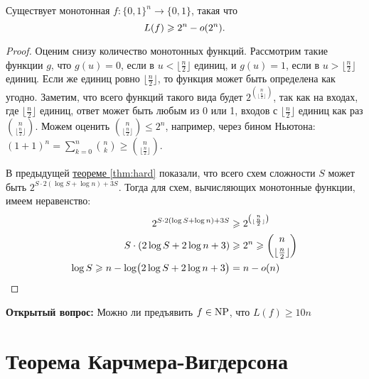 \begin{thm}
	Существует монотонная $ f \colon \{0, 1\}^{n} \to  \{0, 1\}$, такая что 
	$$ L(f) \geqslant 2^{n} - o(2^{n}) .$$
\end{thm}
\begin{proof}
Оценим снизу количество монотонных функций. Рассмотрим такие функции $g$, что $g(u) = 0$, если в $u < \lfloor \frac{n}{2} \rfloor$ единиц, и $g(u) = 1$, если в $u > \lfloor \frac{n}{2} \rfloor$ единиц. Если же единиц ровно $\lfloor \frac{n}{2} \rfloor$, то функция может быть определена как угодно. 
Заметим, что всего функций такого вида будет $2^{n \choose \lfloor \frac{n}{2} \rfloor}$, так как на входах, где  $\lfloor \frac{n}{2} \rfloor$ единиц, ответ может быть любым из 0 или 1, входов с $\lfloor \frac{n}{2} \rfloor$  единиц как раз ${n \choose \lfloor \frac{n}{2} \rfloor}$. 
Можем оценить ${n \choose {\lfloor \frac{n}{2} \rfloor}} \le 2^n$, например, через бином Ньютона: $(1+1)^n = \sum_{k=0}^n {n \choose k} \ge {n \choose \lfloor \frac{n}{2} \rfloor}$.

В предыдущей \hyperref[thm:hard]{теореме \ref{thm:hard}} показали, что всего схем сложности $S$ может быть $2^{S \cdot  2( \log S + \log n) + 3S} $. Тогда для схем, вычисляющих монотонные функции, имеем неравенство:
\begin{align*}
		2^{S \cdot  2( \log S + \log n) + 3S} &\geqslant  2^ {{n \choose \lfloor \frac{n}{2} \rfloor}} \\
		S \cdot  ( 2\log S + 2\log n + 3)&\geqslant 2^n \geqslant {{n \choose \lfloor \frac{n}{2} \rfloor}} 
		\\
		\log S \geqslant n - \log \bigl( 2 \log S + 2 \log n + 3 \bigr) &= n - o(n) 
\end{align*}


\end{proof}

\textbf{Открытый вопрос:} Можно ли предъявить $ f \in \operatorname{NP}$, что $ L(f) \ge  10n$


\section{Теорема Карчмера-Вигдерсона}

